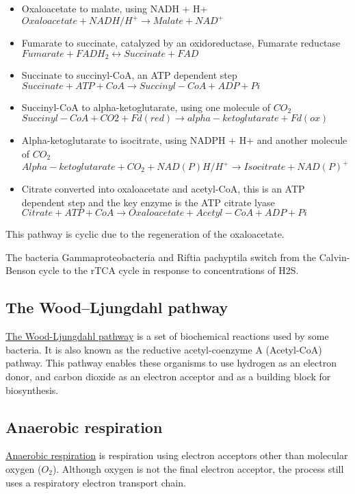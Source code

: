 \documentclass{article}
\begin{document}
\begin{itemize}

    \item Oxaloacetate to malate, using NADH + H+\\
        $Oxaloacetate + NADH / H^+ \rightarrow Malate + NAD^+$
    \item Fumarate to succinate, catalyzed by an oxidoreductase, Fumarate
        reductase\\
        $Fumarate + FADH_2 \leftrightarrow Succinate + FAD$
    \item Succinate to succinyl-CoA, an ATP dependent step\\
        $Succinate + ATP + CoA \rightarrow Succinyl-CoA + ADP + Pi$
    \item Succinyl-CoA to alpha-ketoglutarate, using one molecule of $CO_2$\\
        $Succinyl-CoA + CO2 + Fd{(red)} \rightarrow alpha-ketoglutarate + Fd{(ox)}$
    \item Alpha-ketoglutarate to isocitrate, using NADPH + H+ and another molecule of
        $CO_2$\\
        $Alpha-ketoglutarate + CO_2 + NAD(P)H/H^+ \rightarrow Isocitrate + NAD{(P)}^+$
    \item Citrate converted into oxaloacetate and acetyl-CoA, this is an ATP
        dependent step and the key enzyme is the ATP citrate lyase\\
        $Citrate + ATP + CoA \rightarrow Oxaloacetate + Acetyl-CoA + ADP + Pi$
\end{itemize}

This pathway is cyclic due to the regeneration of the oxaloacetate.

The bacteria Gammaproteobacteria and Riftia pachyptila switch from the Calvin-Benson cycle
to the rTCA cycle in response to concentrations of H2S.

\subsection{The Wood–Ljungdahl pathway}
\href{https://en.wikipedia.org/wiki/Wood-Ljungdahl_pathway}{The Wood-Ljungdahl pathway} is
a set of biochemical reactions used by some bacteria. It is
also known as the reductive acetyl-coenzyme A (Acetyl-CoA) pathway. This pathway
enables these organisms to use hydrogen as an electron donor, and carbon dioxide as an
electron acceptor and as a building block for biosynthesis.

\subsection{Anaerobic respiration}
\href{https://en.wikipedia.org/wiki/Anaerobic_respiration}{Anaerobic respiration} is
respiration using electron acceptors other than molecular oxygen ($O_2$). Although oxygen
is not the final electron acceptor, the process still uses a respiratory electron
transport chain.
\end{document}
